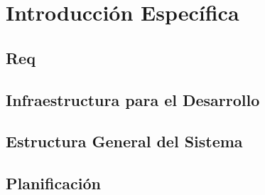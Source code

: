 \chapter{Introducción Específica}
\label{Chapter2}

\section{Req}

\section{Infraestructura para el Desarrollo}

\section{Estructura General del Sistema}

\section{{Planificación}}

